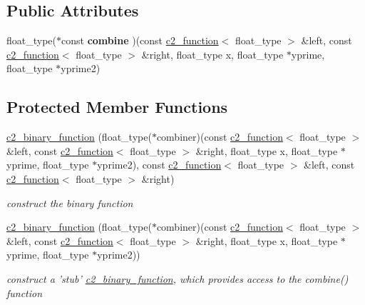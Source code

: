 \subsection*{Public Attributes}
\begin{DoxyCompactItemize}
\item 
\hypertarget{classc2__binary__function_a2c51b642a656be708a08ca222084754a}{float\-\_\-type($\ast$const {\bfseries combine} )(const \hyperlink{classc2__function}{c2\-\_\-function}$<$ float\-\_\-type $>$ \&left, const \hyperlink{classc2__function}{c2\-\_\-function}$<$ float\-\_\-type $>$ \&right, float\-\_\-type x, float\-\_\-type $\ast$yprime, float\-\_\-type $\ast$yprime2)}\label{classc2__binary__function_a2c51b642a656be708a08ca222084754a}

\end{DoxyCompactItemize}
\subsection*{Protected Member Functions}
\begin{DoxyCompactItemize}
\item 
\hyperlink{classc2__binary__function_a1daf580ba04ae495309f9c83bd615f68}{c2\-\_\-binary\-\_\-function} (float\-\_\-type($\ast$combiner)(const \hyperlink{classc2__function}{c2\-\_\-function}$<$ float\-\_\-type $>$ \&left, const \hyperlink{classc2__function}{c2\-\_\-function}$<$ float\-\_\-type $>$ \&right, float\-\_\-type x, float\-\_\-type $\ast$yprime, float\-\_\-type $\ast$yprime2), const \hyperlink{classc2__function}{c2\-\_\-function}$<$ float\-\_\-type $>$ \&left, const \hyperlink{classc2__function}{c2\-\_\-function}$<$ float\-\_\-type $>$ \&right)
\begin{DoxyCompactList}\small\item\em construct the binary function \end{DoxyCompactList}\item 
\hyperlink{classc2__binary__function_a99809843f818ae9c451a0339b0f46bdc}{c2\-\_\-binary\-\_\-function} (float\-\_\-type($\ast$combiner)(const \hyperlink{classc2__function}{c2\-\_\-function}$<$ float\-\_\-type $>$ \&left, const \hyperlink{classc2__function}{c2\-\_\-function}$<$ float\-\_\-type $>$ \&right, float\-\_\-type x, float\-\_\-type $\ast$yprime, float\-\_\-type $\ast$yprime2))
\begin{DoxyCompactList}\small\item\em construct a 'stub' \hyperlink{classc2__binary__function}{c2\-\_\-binary\-\_\-function}, which provides access to the combine() function \end{DoxyCompactList}\end{DoxyCompactItemize}
